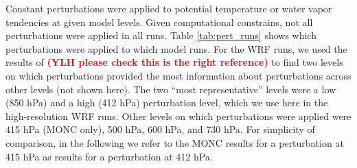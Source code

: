 \documentclass[draft]{agujournal2019}
\newcommand{\todo}[1]{\textcolor{red}{\textbf{(#1)}}}
\begin{document}
Constant perturbations were applied to potential temperature or water vapor
tendencies at given model levels. Given computational constrains, not all
perturbations were applied in all runs.  Table \ref{tab:pert_runs} shows which
perturbations were applied to which model runs. For the WRF runs, we used the
results of  \todo{YLH please check this is the right
reference} to find two levels on which perturbations provided the most
information about perturbations across other levels (not shown here). The two
``most representative'' levels were a low (850 hPa) and a high (412 hPa)
perturbation level, which we use here in the high-resolution WRF runs. Other
levels on which perturbations were applied were 415 hPa (MONC only), 500 hPa,
600 hPa, and 730 hPa. For simplicity of comparison, in the following we refer to
the MONC results for a perturbation at 415 hPa as results for a perturbation at
412 hPa.
\end{document}
